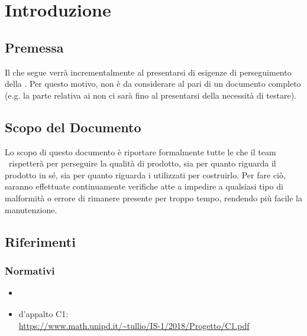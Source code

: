 \section{Introduzione}\label{Introduzione}

    \subsection{Premessa}
    Il  che segue verrà  incrementalmente al presentarsi di esigenze di perseguimento della .
    Per questo motivo, non è da considerare al pari di un documento completo (e.g. la parte relativa ai non ci sarà fino
    al presentarsi della necessità di testare).

    \subsection{Scopo del Documento}
    Lo scopo di questo documento è riportare formalmente tutte le  che il team \gruppo\ rispetterà per perseguire
    la qualità di prodotto, sia per quanto riguarda il prodotto in s\'e, sia per quanto riguarda i 
    utilizzati per costruirlo. Per fare ciò, saranno effettuate continuamente verifiche atte a impedire a qualsiasi tipo di malformità o errore
    di rimanere presente per troppo tempo, rendendo più facile la manutenzione.

    

    


    \subsection{Riferimenti}
	
	\subsubsection{Normativi}
    \begin{itemize}
    	\item \textit{\NdPv}
    	\item {} d'appalto C1:\\ \url{https://www.math.unipd.it/~tullio/IS-1/2018/Progetto/C1.pdf}
    \end{itemize}
    
